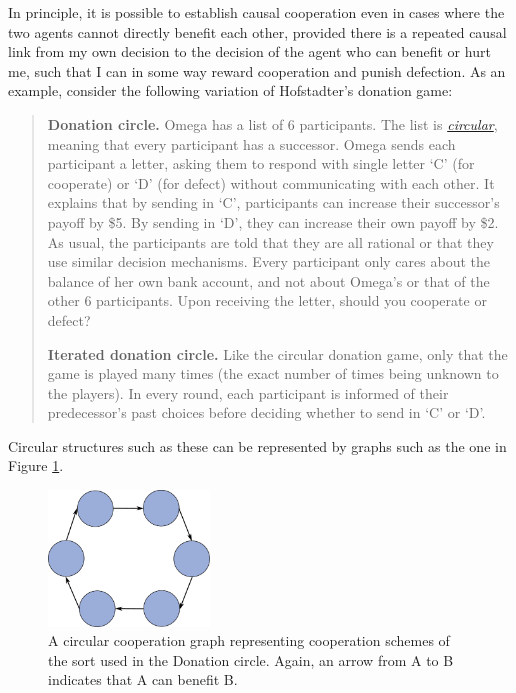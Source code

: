 In principle, it is possible to establish causal cooperation even in
cases where the two agents cannot directly benefit each other, provided
there is a repeated causal link from my own decision to the decision of
the agent who can benefit or hurt me, such that I can in some way reward
cooperation and punish defection. As an example, consider the following
variation of Hofstadter's donation game:

\begin{quote}
\textbf{Donation circle.} Omega has a list of 6 participants. The list
is
\href{https://en.wikipedia.org/wiki/Linked_list\#Circular_Linked_list}{\emph{circular}},
meaning that every participant has a successor. Omega sends each
participant a letter, asking them to respond with single letter `C' (for
cooperate) or `D' (for defect) without communicating with each other. It
explains that by sending in `C', participants can increase their
successor's payoff by \$5. By sending in `D', they can increase their
own payoff by \$2. As usual, the participants are told that they are all
rational or that they use similar decision mechanisms. Every participant
only cares about the balance of her own bank account, and not about
Omega's or that of the other 6 participants. Upon receiving the letter,
should you cooperate or defect?

\textbf{Iterated donation circle.} Like the circular donation game, only
that the game is played many times (the exact number of times being
unknown to the players). In every round, each participant is informed of
their predecessor's past choices before deciding whether to send in `C'
or `D'.
\end{quote}

Circular structures such as these can be represented by graphs such as
the one in Figure \ref{circular-cooperation-graph}.

\begin{figure}[h!]
    \centering
    \includegraphics[width=1.68409in]{figs/circular-cooperation-graph}
    \caption{A circular cooperation graph
representing cooperation schemes of the sort used in the Donation
circle. Again, an arrow from A to B indicates that A can benefit B.}
    \label{circular-cooperation-graph}
\end{figure}

